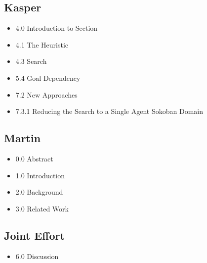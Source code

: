 \documentclass[10pt,a4paper]{article}
\begin{document}
	\subsection{Kasper}
		\begin{itemize}
			\item 4.0 Introduction to Section
			\item 4.1 The Heuristic
			\item 4.3 Search
			\item 5.4 Goal Dependency
			\item 7.2 New Approaches
			\item 7.3.1 Reducing the Search to a Single Agent Sokoban Domain
		\end{itemize}
	\subsection{Martin}
		\begin{itemize}
			\item 0.0 Abstract
			\item 1.0 Introduction
			\item 2.0 Background
			\item 3.0 Related Work
		\end{itemize}

	\subsection{Joint Effort}
		\begin{itemize}
			\item 6.0 Discussion
		\end{itemize}
\end{document}
